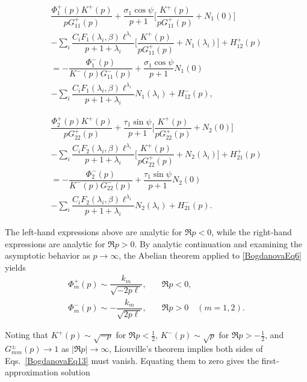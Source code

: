 	\begin{multline*}
			\dfrac{\Phi_{1}^{+}(p)K^{+}(p)}{pG_{11}^{+}(p)}
			+\dfrac{\sigma_{1}\cos\psi}{p+1}
			\biggl[\dfrac{K^{+}(p)}{pG_{11}^{+}(p)}+N_{1}(0)\biggr]
			\\
			-\sum_{i}\dfrac{C_{i}F_{1}(\lambda_{i},\beta)\ell^{\lambda_{i}}}
			{p+1+\lambda_{i}}
			\biggl[\dfrac{K^{+}(p)}{pG_{11}^{+}(p)}+N_{1}(\lambda_{i})\biggr]
			+H_{12}^{+}(p)
		\\
		=-\dfrac{\Phi_{1}^{-}(p)}{K^{-}(p)G_{11}^{-}(p)}
		+\dfrac{\sigma_{1}\cos\psi}{p+1}N_{1}(0)
		\\
		-\sum_{i}\dfrac{C_{i}F_{1}(\lambda_{i},\beta)\ell^{\lambda_{i}}}
		{p+1+\lambda_{i}}N_{1}(\lambda_{i})
		+H_{12}^{-}(p),
	\end{multline*}
	
	\begin{multline*}
			\dfrac{\Phi_{2}^{+}(p) K^{+}(p)}{p G_{22}^{+}(p)}
			+\dfrac{\tau_{1}\sin\psi}{p+1}
			\biggl[\dfrac{K^{+}(p)}{p G_{22}^{+}(p)}+N_{2}(0)\biggr]
			\\
			-\sum_{i}\dfrac{C_{i}F_{2}(\lambda_{i},\beta)\ell^{\lambda_{i}}}
			{p+1+\lambda_{i}}
			\biggl[\dfrac{K^{+}(p)}{pG_{22}^{+}(p)}+N_{2}(\lambda_{i})\biggr]
			+H_{21}^{+}(p)
		\\
		=	-\dfrac{\Phi_{2}^{-}(p)}{K^{-}(p) G_{22}^{-}(p)}
		+\dfrac{\tau_{1}\sin\psi}{p+1} N_{2}(0)
		\\
		-\sum_{i}\dfrac{C_{i}F_{2}(\lambda_{i},\beta) \ell^{\lambda_{i}}}
		{p+1+\lambda_{i}} N_{2}(\lambda_{i})
		+H_{21}^{-}(p) .
	\end{multline*}

The left‐hand expressions above are analytic for \(\Re p<0\), while the right‐hand expressions are analytic for \(\Re p>0\).  By analytic continuation and examining the asymptotic behavior as \(p\to\infty\), the Abelian theorem applied to \eqref{BogdanovaEq6} yields
\begin{equation}\label{BogdanovaEq14}
\begin{array}{ll}
	\Phi_{m}^{+}(p)\sim\dfrac{k_{m}}{\sqrt{-2p\ell}},&\quad \Re p<0,
\\
\Phi_{m}^{-}(p)\sim -\dfrac{k_{m}}{\sqrt{2p\ell}},&\quad \Re p>0
\quad (m=1,2).
\end{array}
\end{equation}

\noindent Noting that \(K^{+}(p)\sim\sqrt{-p}\) for \(\Re p<\tfrac12\), \(K^{-}(p)\sim\sqrt{p}\) for \(\Re p>-\tfrac12\), and \(G_{mm}^{\pm}(p)\to1\) as \(|\Re p|\to\infty\), Liouville’s theorem implies both sides of Eqs.~\eqref{BogdanovaEq13} must vanish.  Equating them to zero gives the first‐approximation solution

